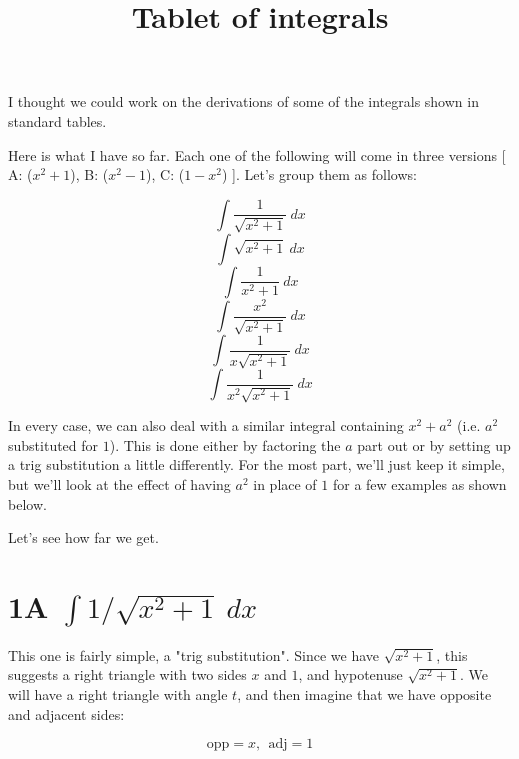 \documentclass[11pt, oneside]{article}
\title{Tablet of integrals}
\date{}
\begin{document}
\maketitle
\Large

I thought we could work on the derivations of some of the integrals shown in standard tables.  

Here is what I have so far.  Each one of the following will come in three versions [ A:  ($x^2 + 1$), B:  ($x^2 - 1$), C:  ($1 - x^2$) ].  Let's group them as follows:

\begin{equation} \int \frac{1}{\sqrt{x^2 + 1}} \ dx \end{equation}
\begin{equation} \int \sqrt{x^2 + 1} \ dx \end{equation}
\begin{equation} \int \frac{1}{x^2 + 1} \ dx \end{equation}
\begin{equation} \int \frac{x^2}{\sqrt{x^2 +1}} \ dx \end{equation}
\begin{equation} \int \frac{1}{x\sqrt{x^2 + 1}} \ dx \end{equation}
\begin{equation} \int \frac{1}{x^2 \sqrt{x^2 + 1}} \ dx \end{equation}

In every case, we can also deal with a similar integral containing $x^2 + a^2$ (i.e. $a^2$ substituted for $1$).  This is done either by factoring the $a$ part out or by setting up a trig substitution a little differently.  For the most part, we'll just keep it simple, but we'll look at the effect of having $a^2$ in place of $1$  for a few examples as shown below.  

Let's see how far we get.

\section*{1A $\int 1/\sqrt{x^2 + 1} \ dx$ }

This one is fairly simple, a "trig substitution".  Since we have $\sqrt{x^2 + 1}$, this suggests a right triangle with two sides $x$ and $1$, and hypotenuse $\sqrt{x^2 + 1}$.  We will have a right triangle with angle $t$, and then imagine that we have opposite and adjacent sides:

\[ \text{opp} = x, \ \ \text{adj} = 1 \]
\end{document}
